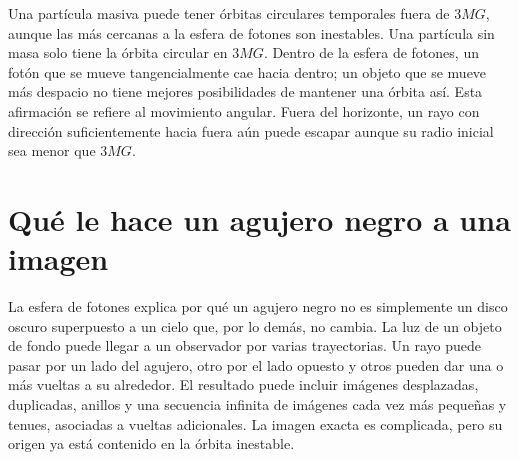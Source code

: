 \begin{classroomqa}
\end{classroomqa}

\begin{classroomqa}
\end{classroomqa}

Una partícula masiva puede tener órbitas circulares temporales fuera de \(3MG\), aunque las más cercanas a la esfera de fotones son inestables. Una partícula sin masa solo tiene la órbita circular en \(3MG\). Dentro de la esfera de fotones, un fotón que se mueve tangencialmente cae hacia dentro; un objeto que se mueve más despacio no tiene mejores posibilidades de mantener una órbita así. Esta afirmación se refiere al movimiento angular. Fuera del horizonte, un rayo con dirección suficientemente hacia fuera aún puede escapar aunque su radio inicial sea menor que \(3MG\).

\section{Qué le hace un agujero negro a una imagen}

La esfera de fotones explica por qué un agujero negro no es simplemente un disco oscuro superpuesto a un cielo que, por lo demás, no cambia. La luz de un objeto de fondo puede llegar a un observador por varias trayectorias. Un rayo puede pasar por un lado del agujero, otro por el lado opuesto y otros pueden dar una o más vueltas a su alrededor. El resultado puede incluir imágenes desplazadas, duplicadas, anillos y una secuencia infinita de imágenes cada vez más pequeñas y tenues, asociadas a vueltas adicionales. La imagen exacta es complicada, pero su origen ya está contenido en la órbita inestable.

